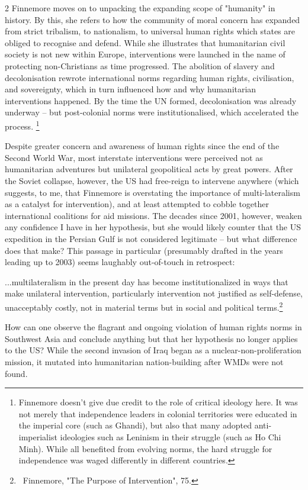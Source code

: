\documentclass[letterpaper,12pt,twoside]{article}
\begin{document}
\begin {multicols}{2}
Finnemore moves on to unpacking the expanding scope of "humanity" in history. By this, she refers to how the community of moral concern has expanded from strict tribalism, to nationalism, to universal human rights which states are obliged to recognise and defend. While she illustrates that humanitarian civil society is not new within Europe, interventions were launched in the name of protecting non-Christians as time progressed. The abolition of slavery and decolonisation rewrote international norms regarding human rights, civilisation, and sovereignty, which in turn influenced how and why humanitarian interventions happened. By the time the UN formed, decolonisation was already underway – but post-colonial norms were institutionalised, which accelerated the process. \footnote{
  Finnemore doesn't give due credit to the role of critical ideology here. It was not merely that independence leaders in colonial territories were educated in the imperial core (such as Ghandi), but also that many adopted anti-imperialist ideologies such as Leninism in their struggle (such as Ho Chi Minh). While all benefited from evolving norms, the hard struggle for independence was waged differently in different countries. %
}

Despite greater concern and awareness of human rights since the end of the Second World War, most interstate interventions were perceived not as humanitarian adventures but unilateral geopolitical acts by great powers. After the Soviet collapse, however, the US had free-reign to intervene anywhere (which suggests, to me, that Finnemore is overstating the importance of multi-lateralism as a catalyst for intervention), and at least attempted to cobble together international coalitions for aid missions. The decades since 2001, however, weaken any confidence I have in her hypothesis, but she would likely counter that the US expedition in the Persian Gulf is not considered legitimate – but what difference does that make? This passage in particular (presumably drafted in the years leading up to 2003) seems laughably out-of-touch in retrospect:
  \begin{displayquote}
    ...multilateralism in the present day has become insti­tutionalized in ways that make unilateral intervention, particularly inter­vention not justified as self-defense, unacceptably costly, not in material terms but in social and political terms.\footnote{\
      Finnemore, "The Purpose of Intervention", 75.
    }
  \end{displayquote}
How can one observe the flagrant and ongoing violation of human rights norms in Southwest Asia and conclude anything but that her hypothesis no longer applies to the US? While the second invasion of Iraq began as a nuclear-non-proliferation mission, it mutated into humanitarian nation-building after WMDs were not found.


\end{multicols}
\end{document}
